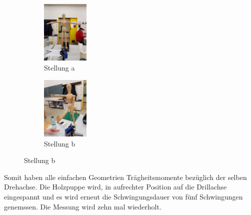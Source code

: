 \begin{figure}
  \centering
  \begin{subfigure}{0.48\textwidth}
    \centering
    \includegraphics[height=3.00cm, angle=270]{20161108_135922.jpg}
    \caption{Stellung a}
    \label{fig:stellunga}
  \end{subfigure}
  \begin{subfigure}{0.48\textwidth}
    \centering
    \includegraphics[height=3.00cm, angle=270]{20161108_142541.jpg}
    \caption{Stellung b}
    \label{fig:stellunb}
  \end{subfigure}
  \label{fig:Holzpuppe}
\end{figure}

Somit haben alle einfachen Geometrien Trägheitsmomente bezüglich der selben Drehachse. Die Holzpuppe wird, in aufrechter Position auf die Drillachse eingespannt und es wird erneut die Schwingungsdauer von fünf Schwingungen genemssen. Die Messung wird zehn mal wiederholt.
\newpage
%
